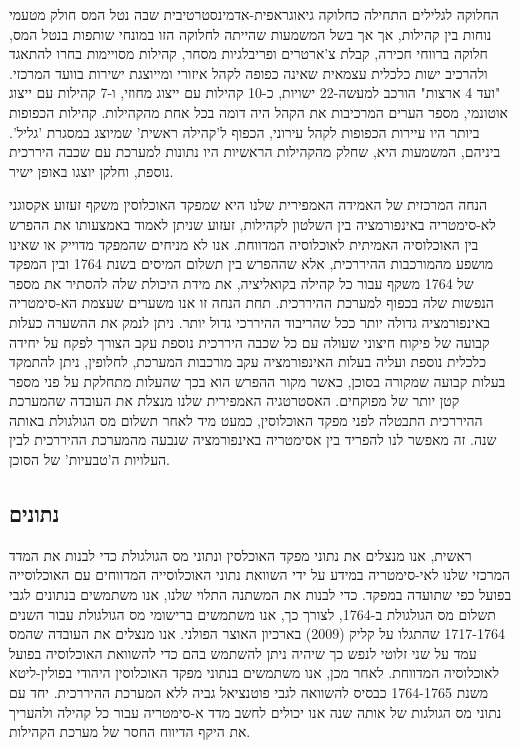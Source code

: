החלוקה לגלילים התחילה כחלוקה גיאוגראפית-אדמינסטרטיבית שבה נטל המס חולק מטעמי נוחות בין קהילות, אך אך בשל המשמעות שהייתה לחלוקה הזו במונחי שותפות בנטל המס, חלוקה ברווחי חכירה, קבלת צ'ארטרים ופריבלגיות מסחר, קהילות מסויימות בחרו להתאגד ולהרכיב ישות כלכלית עצמאית שאינה כפופה לקהל איזורי ומייוצגת ישירות בוועד המרכזי. "ועד 4 ארצות" הורכב למעשה-22 ישויות, כ-10 קהילות עם ייצוג מחוזי, ו-7 קהילות עם ייצוג אוטונמי, מספר הערים המרכיבות את הקהל היה דומה בכל אחת מהקהילות. קהילות הכפופות ביותר היו עיירות הכפופות לקהל עירוני, הכפוף ל'קהילה ראשית' שמיוצג במסגרת 'גליל'. ביניהם,  המשמעות היא, שחלק מהקהילות הראשיות היו נתונות למערכת עם שכבה היררכית נוספת, וחלקן יוצגו באופן ישיר.

הנחה המרכזית של האמידה האמפירית שלנו היא שמפקד האוכלוסין משקף זעזוע אקסוגני לא-סימטריה באינפורמציה בין השלטון לקהילות, זעזוע שניתן לאמוד באמצעותו את ההפרש בין האוכלוסיה האמיתית לאוכלוסיה המדווחת. אנו לא מניחים שהמפקד מדוייק או שאינו מושפע מהמורכבות ההיררכית, אלא  שההפרש בין תשלום המיסים בשנת 1764 ובין המפקד של 1764 משקף עבור כל קהילה בקואליציה, את מידת היכולת שלה להסתיר את מספר הנפשות שלה בכפוף למערכת ההיררכית. תחת הנחה זו אנו משערים שעצמת הא-סימטריה באינפורמציה גדולה יותר ככל שהריבוד ההיררכי גדול יותר. ניתן לנמק את ההשערה כעלות קבועה של פיקוח חיצוני שעולה עם כל שכבה היררכית נוספת עקב הצורך לפקח על יחידה כלכלית נוספת ועליה בעלות האינפורמציה עקב מורכבות המערכת, לחלופין, ניתן להתמקד בעלות קבועה שמקורה בסוכן, כאשר מקור ההפרש הוא בכך שהעלות מתחלקת על פני מספר קטן יותר של מפוקחים. האסטרטגיה האמפירית שלנו מנצלת את העובדה שהמערכת ההיררכית התבטלה לפני מפקד האוכלוסין, כמעט מיד לאחר תשלום מס הגולגולת באותה שנה. זה מאפשר לנו להפריד בין אסימטריה באינפורמציה שנבעה מהמערכת ההיררכית לבין העלויות ה'טבעיות' של הסוכן.


\subsection{נתונים}
ראשית, אנו מנצלים את נתוני מפקד האוכלסין ונתוני מס הגולגולת כדי לבנות את המדד המרכזי שלנו לאי-סימטריה במידע על ידי השוואת נתוני האוכלוסייה המדווחים עם האוכלוסייה בפועל כפי שתועדה במפקד.
כדי לבנות את המשתנה התלוי שלנו, אנו משתמשים בנתונים לגבי תשלום מס הגולגולת ב-1764, לצורך כך, אנו משתמשים ברישומי מס הגולגולת עבור השנים 1717-1764 שהתגלו על קליק (2009) בארכיון האוצר הפולני. אנו מנצלים את העובדה שהמס עמד על שני זלוטי לנפש כך שיהיה ניתן להשתמש בהם כדי להשוואת האוכלוסיה בפועל לאוכלוסיה המדווחת.
לאחר מכן, אנו משתמשים בנתוני מפקד האוכלוסין היהודי בפולין-ליטא משנת 1764-1765 כבסיס להשוואה לגבי פוטנציאל גביה ללא המערכת ההיררכית. יחד עם נתוני מס הגולגות של אותה שנה אנו יכולים לחשב מדד א-סימטריה עבור כל קהילה ולהעריך את היקף הדיווח החסר של מערכת הקהילות.

